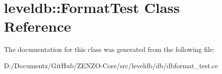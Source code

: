 \hypertarget{classleveldb_1_1_format_test}{}\section{leveldb\+::Format\+Test Class Reference}
\label{classleveldb_1_1_format_test}


The documentation for this class was generated from the following file\+:\begin{DoxyCompactItemize}
\item 
D\+:/\+Documentz/\+Git\+Hub/\+Z\+E\+N\+Z\+O-\/\+Core/src/leveldb/db/dbformat\+\_\+test.\+cc\end{DoxyCompactItemize}

